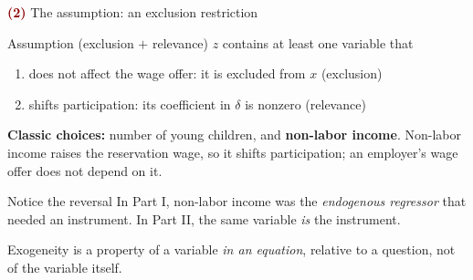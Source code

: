 \documentclass[aspectratio=169,11pt]{beamer}
\newcommand{\Part}[1]{\textcolor{DarkRed}{\textbf{(#1)}}}
\begin{document}
\begin{frame}{\Part{2} The assumption: an exclusion restriction}

\begin{block}{Assumption (exclusion $+$ relevance)}
$z$ contains at least one variable that
\begin{enumerate}
  \item does not affect the wage offer: it is excluded from $x$ \hfill (exclusion)
  \item shifts participation: its coefficient in $\delta$ is nonzero \hfill (relevance)
\end{enumerate}
\end{block}

\pause

\textbf{Classic choices:} number of young children, and
\textbf{non-labor income}.
Non-labor income raises the reservation wage, so it shifts
participation; an employer's wage offer does not depend on it.

\pause

\vspace{0.3em}

\begin{alertblock}{Notice the reversal}
In Part I, non-labor income was the \emph{endogenous regressor} that
needed an instrument. In Part II, the same variable \emph{is} the
instrument.

Exogeneity is a property of a variable \emph{in an equation}, relative to
a question, not of the variable itself.
\end{alertblock}

\end{frame}
\end{document}
